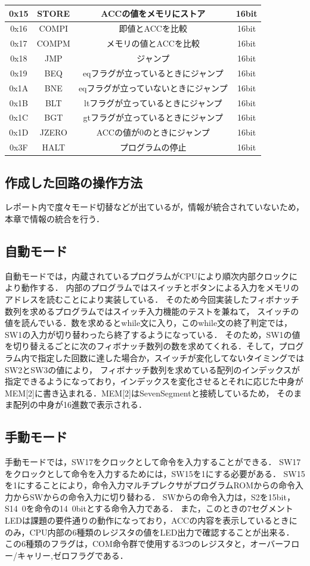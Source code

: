 \documentclass[a4paper,11pt]{ltjsarticle}
\begin{document}
\begin{table}[H]
\begin{tabular}{|c|c|c|c|}
        \hline
        0x15 & STORE & ACCの値をメモリにストア & 16bit \\
        \hline
        0x16 & COMPI & 即値とACCを比較 & 16bit \\
        \hline
        0x17 & COMPM & メモリの値とACCを比較 & 16bit \\
        \hline
        0x18 & JMP & ジャンプ & 16bit \\
        \hline
        0x19 & BEQ & eqフラグが立っているときにジャンプ & 16bit \\
        \hline
        0x1A & BNE & eqフラグが立っていないときにジャンプ & 16bit \\
        \hline
        0x1B & BLT & ltフラグが立っているときにジャンプ & 16bit \\
        \hline
        0x1C & BGT & gtフラグが立っているときにジャンプ & 16bit \\
        \hline
        0x1D & JZERO & ACCの値が0のときにジャンプ & 16bit \\
        \hline
        0x3F & HALT & プログラムの停止 & 16bit \\
        \hline
    \end{tabular}
\end{table}
\newpage
\subsection{作成した回路の操作方法}
レポート内で度々モード切替などが出ているが，情報が統合されていないため，本章で情報の統合を行う．
\subsection{自動モード}
自動モードでは，内蔵されているプログラムがCPUにより順次内部クロックにより動作する．
内部のプログラムではスイッチとボタンによる入力をメモリのアドレスを読むことにより実装している．
そのため今回実装したフィボナッチ数列を求めるプログラムではスイッチ入力機能のテストを兼ねて，
スイッチの値を読んでいる．数を求めるとwhile文に入り，このwhile文の終了判定では，SW1の入力が切り替わったら終了するようになっている．
そのため，SW1の値を切り替えるごとに次のフィボナッチ数列の数を求めてくれる．そして，プログラム内で指定した回数に達した場合か，スイッチが変化してないタイミングではSW2とSW3の値により，
フィボナッチ数列を求めている配列のインデックスが指定できるようになっており，インデックスを変化させるとそれに応じた中身がMEM[2]に書き込まれる．MEM[2]はSevenSegmentと接続しているため，
そのまま配列の中身が16進数で表示される．
\subsection{手動モード}
手動モードでは，SW17をクロックとして命令を入力することができる．
SW17をクロックとして命令を入力するためには，SW15を1にする必要がある．
SW15を1にすることにより，命令入力マルチプレクサがプログラムROMからの命令入力からSWからの命令入力に切り替わる．
SWからの命令入力は，S2を15bit，S14~0を命令の14~0bitとする命令入力である．
また，このときの7セグメントLEDは課題の要件通りの動作になっており，ACCの内容を表示しているときにのみ，CPU内部の6種類のレジスタの値をLED出力で確認することが出来る．
この6種類のフラグは，COM命令群で使用する3つのレジスタと，オーバーフロー/キャリー,ゼロフラグである．
\end{document}

